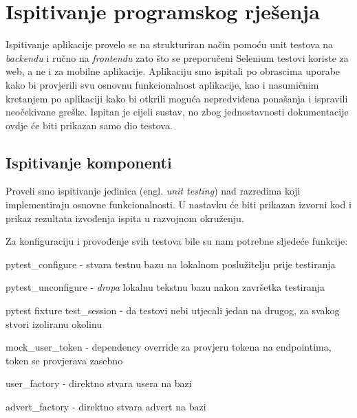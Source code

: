 			\eject 
		
	
		\section{Ispitivanje programskog rješenja}
			
			Ispitivanje aplikacije provelo se na strukturiran način pomoću unit testova na \textit{backendu} i ručno na \textit{frontendu} zato što se preporučeni Selenium testovi koriste za web, a ne i za mobilne aplikacije. Aplikaciju smo ispitali po obrascima uporabe kako bi provjerili svu osnovnu funkcionalnost aplikacije, kao i nasumičnim kretanjem po aplikaciji kako bi otkrili moguća nepredviđena ponašanja i ispravili neočekivane greške. Ispitan je cijeli sustav, no zbog jednostavnosti dokumentacije ovdje će biti prikazan samo dio testova.
			
			\subsection{Ispitivanje komponenti}
		
			Proveli smo ispitivanje jedinica (engl. \textit{unit testing}) nad razredima koji implementiraju osnovne funkcionalnosti. U nastavku će biti prikazan izvorni kod i prikaz rezultata izvođenja ispita u razvojnom okruženju.

			Za konfiguraciju i provođenje svih testova bile su nam potrebne sljedeće funkcije: 
	
			\begin{packed_item}
			
				\item pytest{\_}configure - stvara testnu bazu na lokalnom poslužitelju prije testiranja
				\item pytest{\_}unconfigure - \textit{dropa} lokalnu tekstnu bazu nakon završetka testiranja
				\item pytest fixture test{\_}session - da testovi nebi utjecali jedan na drugog, za svakog stvori izoliranu okolinu
				\item mock{\_}user{\_}token - dependency override za provjeru tokena na endpointima, token se provjerava zasebno
				\item user{\_}factory - direktno stvara usera na bazi
				\item advert{\_}factory - direktno stvara advert na bazi
			
			\end{packed_item}

